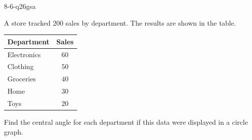 \begin{practiceQuestion}{8-6-q26}{gsa}
\begin{questionText}
A store tracked $200$ sales by department. The results are shown in the table.

\begin{center}
\begin{tabular}{|l|c|}
\hline
\textbf{Department} & \textbf{Sales} \\
\hline
Electronics & $60$ \\
Clothing & $50$ \\
Groceries & $40$ \\
Home & $30$ \\
Toys & $20$ \\
\hline
\end{tabular}
\end{center}

Find the central angle for each department if this data were displayed in a circle graph.
\end{questionText}
\end{practiceQuestion}


